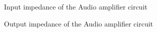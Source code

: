 \begin{figure}[H] \centering
\caption{Input impedance of the Audio amplifier circuit}
\label{fig:In_imp}
\end{figure}
\vspace{-3cm}


\begin{figure}[H] \centering
\caption{Output impedance of the Audio amplifier circuit}
\label{fig:out_imp}
\end{figure}
\vspace{-3cm}


\pagebreak
